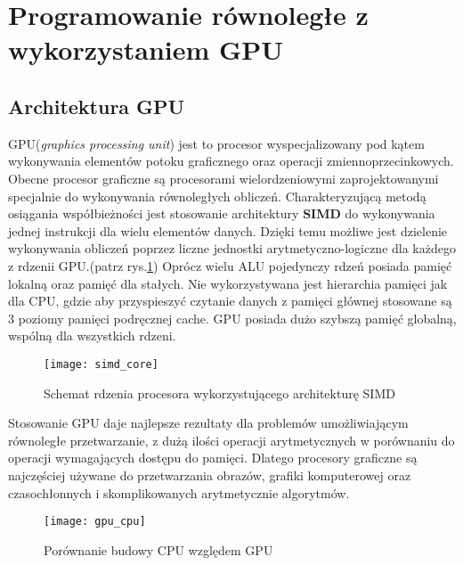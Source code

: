 \documentclass[document.tex]{subfiles}
\begin{document}

\clearpage


\section{Programowanie równoległe z wykorzystaniem GPU} \label{chapter_gpu}

\subsection{Architektura GPU}

\indent GPU(\textit{graphics processing unit}) jest to  
procesor wyspecjalizowany pod kątem wykonywania elementów potoku
graficznego oraz operacji zmiennoprzecinkowych. Obecne procesor graficzne
są procesorami wielordzeniowymi zaprojektowanymi specjalnie do wykonywania 
równoległych obliczeń. Charakteryzującą metodą osiągania współbieżności jest stosowanie architektury \textbf{SIMD} do wykonywania jednej instrukcji dla wielu elementów danych. Dzięki temu możliwe jest dzielenie wykonywania obliczeń poprzez liczne jednostki arytmetyczno-logiczne dla każdego z rdzenii GPU.(patrz rys.\ref{fig:simd_core})\cite{OpenCL_Gaster}\cite{Computer_Architecture_Patterson_Hennesy}
Oprócz wielu ALU pojedynczy rdzeń posiada pamięć lokalną
oraz pamięć dla stałych. Nie wykorzystywana jest hierarchia pamięci jak dla CPU, gdzie aby przyspieszyć 
czytanie danych z pamięci głównej stosowane są 3 poziomy pamięci podręcznej cache. GPU posiada dużo szybszą pamięć globalną, wspólną dla wszystkich rdzeni.

\begin{figure}[h]
\texttt{[image: simd\_core]}
\caption{Schemat rdzenia procesora wykorzystującego architekturę SIMD \protect\cite{Intro_GPU}}
\label{fig:simd_core}
\end{figure}

\indent Stosowanie GPU daje najlepsze rezultaty dla problemów umożliwiającym równoległe przetwarzanie, z dużą ilości operacji arytmetycznych w porównaniu do operacji wymagających dostępu do pamięci.
Dlatego procesory graficzne są najczęściej używane do przetwarzania obrazów, grafiki komputerowej oraz 
czasochłonnych i skomplikowanych arytmetycznie algorytmów.\cite{GPU_Owens}\cite{OpenCL_Gaster}
\begin{figure}[h]
\texttt{[image: gpu\_cpu]}
\caption{Porównanie budowy CPU względem GPU\protect\cite{OS_Stallings}}
\label{fig:gpu_cpu}
\end{figure}
\end{document}
